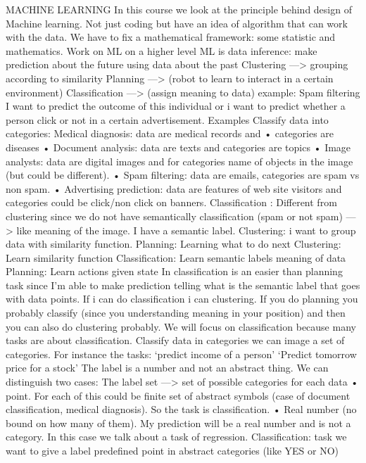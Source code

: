 \documentclass[12pt]{article}
\begin{document}
MACHINE LEARNING
In this course we look at the principle behind design of Machine learning.
Not just coding but have an idea of algorithm that can work with the data.
We have to fix a mathematical framework: some statistic and mathematics.
Work on ML on a higher level
ML is data inference: make prediction about the future using data about the
past
Clustering —> grouping according to similarity
Planning —> (robot to learn to interact in a certain environment)
Classification —> (assign meaning to data) example: Spam filtering
I want to predict the outcome of this individual or i want to predict whether a
person click or not in a certain advertisement.
Examples
Classify data into categories:
Medical diagnosis: data are medical records and • categories are diseases
• Document analysis: data are texts and categories are topics
• Image analysts: data are digital images and for categories name of objects
in the image (but could be different).
• Spam filtering: data are emails, categories are spam vs non spam.
• Advertising prediction: data are features of web site visitors and categories
could be click/non click on banners.
Classification : Different from clustering since we do not have semantically
classification (spam or not spam) —> like meaning of the image.
I have a semantic label.
Clustering: i want to group data with similarity function.
Planning: Learning what to do next
Clustering: Learn similarity function
Classification: Learn semantic labels meaning of data
Planning: Learn actions given state
In classification is an easier than planning task since I’m able to make
prediction telling what is the semantic label that goes with data points.
If i can do classification i can clustering.
If you do planning you probably classify (since you understanding meaning in
your position) and then you can also do clustering probably.
We will focus on classification because many tasks are about classification.
Classify data in categories we can image a set of categories.
For instance the tasks:
‘predict income of a person’
‘Predict tomorrow price for a stock’
The label is a number and not an abstract thing.
We can distinguish two cases:
The label set —> set of possible categories for each data • point. For each of
this could be finite set of abstract symbols (case of document classification,
medical diagnosis). So the task is classification.
• Real number (no bound on how many of them). My prediction will be a real
number and is not a category. In this case we talk about a task of
regression.
Classification: task we want to give a label predefined point in abstract
categories (like YES or NO)
\end{document}
